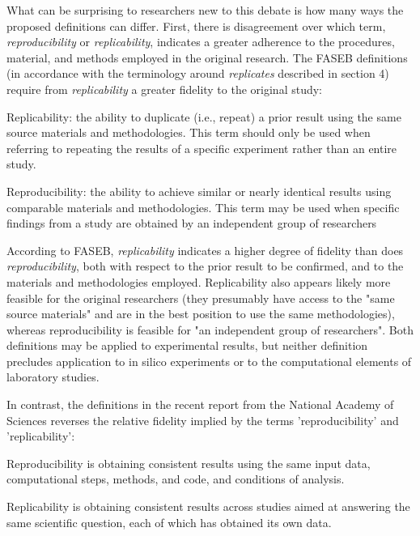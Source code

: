 What can be surprising to researchers new to this debate is how many ways the proposed definitions
	can differ.
First, there is disagreement over which term, \emph{reproducibility} or \emph{replicability}, indicates
	 a greater adherence to the procedures, material,  and methods employed in the original research.
The FASEB definitions (in accordance with the terminology around \emph{replicates} described in section 4)
	require from \emph{replicability} a greater fidelity to the original study:

	Replicability: the ability to duplicate (i.e., repeat) a prior result using the same
	source materials and methodologies. This term should only be used when
	referring to repeating the results of a specific experiment rather than an
	entire study.

	Reproducibility: the ability to achieve similar or nearly identical results using comparable materials and methodologies. 
	This term may be used when specific findings from a study are obtained by an independent group of researchers

According to FASEB, \emph{replicability} indicates a higher degree of fidelity than does \emph{reproducibility}, 
	both with respect to the prior result to be confirmed, and to the materials and methodologies employed.
Replicability also appears likely more feasible for the original researchers (they presumably have access to the 
	"same source materials" and are in the best position to use the same methodologies), whereas reproducibility is 
	feasible for "an independent group of researchers". 
Both definitions may be applied to experimental results, but neither definition precludes application to in silico 
	experiments or to the computational elements of laboratory studies.

 In contrast, the definitions in the recent report from the National Academy of Sciences reverses the relative fidelity
implied by the  terms 'reproducibility' and 'replicability':

	Reproducibility is obtaining consistent results using the same input data, computational
	steps, methods, and code, and conditions of analysis. 

	Replicability is obtaining consistent results across studies aimed at answering the same
	scientific question, each of which has obtained its own data.

